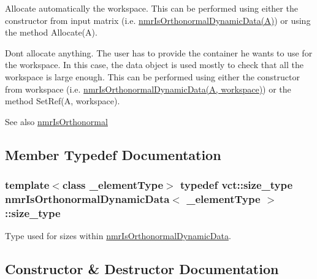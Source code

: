 \begin{DoxyItemize}
\item Allocate automatically the workspace. This can be performed using either the constructor from input matrix (i.\+e. \hyperlink{classnmr_is_orthonormal_dynamic_data}{nmr\+Is\+Orthonormal\+Dynamic\+Data(\+A)}) or using the method Allocate(\+A).
\item Don\textquotesingle{}t allocate anything. The user has to provide the container he wants to use for the workspace. In this case, the data object is used mostly to check that all the workspace is large enough. This can be performed using either the constructor from workspace (i.\+e. \hyperlink{classnmr_is_orthonormal_dynamic_data}{nmr\+Is\+Orthonormal\+Dynamic\+Data(\+A, workspace)}) or the method Set\+Ref(\+A, workspace).
\end{DoxyItemize}

\begin{DoxySeeAlso}{See also}
\hyperlink{nmr_is_orthonormal_8h_acf0ff1e2dbe0c988db04d9db1e2e7697}{nmr\+Is\+Orthonormal} 
\end{DoxySeeAlso}


\subsection{Member Typedef Documentation}
\hypertarget{classnmr_is_orthonormal_dynamic_data_ae69581f9b270b49b1cd1d16ff29a5409}{}
\subsubsection[{size\+\_\+type}]{\setlength{\rightskip}{0pt plus 5cm}template$<$class \+\_\+element\+Type$>$ typedef {\bf vct\+::size\+\_\+type} {\bf nmr\+Is\+Orthonormal\+Dynamic\+Data}$<$ \+\_\+element\+Type $>$\+::{\bf size\+\_\+type}}\label{classnmr_is_orthonormal_dynamic_data_ae69581f9b270b49b1cd1d16ff29a5409}
Type used for sizes within \hyperlink{classnmr_is_orthonormal_dynamic_data}{nmr\+Is\+Orthonormal\+Dynamic\+Data}. 

\subsection{Constructor \& Destructor Documentation}
\hypertarget{classnmr_is_orthonormal_dynamic_data_ab391fa9a04f60d02959c3d13e764bec4}{}
